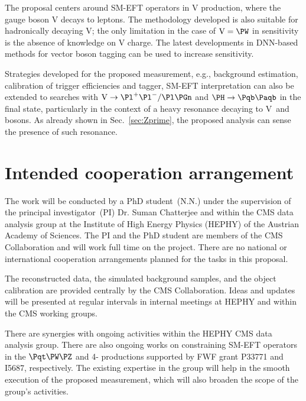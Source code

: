 \documentclass[a4paper,11pt]{article}
\newcommand{\Pb}{{{\Pqb}}\xspace}
\newcommand{\Pt}{{{\Pqt}}\xspace}
\newcommand{\PAb}{{{{\Paqb}}}\xspace}
\newcommand{\PAt}{{{{\Paqt}}}\xspace}
\renewcommand{\PV}{{{{V}}}\xspace}
\newcommand{\VH}{{{\PV}{\PH}}\xspace}
\begin{document}
The proposal centers around SM-EFT operators in \VH production, where the gauge boson \PV decays to leptons. 
The methodology developed is also suitable for hadronically decaying \PV; 
the only limitation in the case of $\textrm{\PV}={\PW}$ in sensitivity is the absence of knowledge on \PV charge. 
The latest developments in DNN-based methods for vector boson tagging can be used to increase sensitivity. 

Strategies developed for the proposed measurement, e.g., background estimation, calibration of trigger efficiencies and \PH tagger, SM-EFT interpretation can also be extended to searches with $\textrm{\PV}\rightarrow \Pl^{+}\Pl^{-} / \Pl \Pgn$ and $\PH \to \Pb \PAb$ in the final state, particularly in the context of a heavy resonance decaying to \PV~and~{\PH} bosons. 
As already shown in Sec.~\ref{sec:Zprime}, the proposed analysis can sense the presence of such resonance. 


\section{Intended cooperation arrangement} 

The work will be conducted by a PhD student~(N.N.) under the supervision of the principal investigator~(PI) Dr. Suman Chatterjee and within the  CMS data analysis group at the Institute of High Energy Physics (HEPHY) of the Austrian Academy of Sciences. The PI and the PhD student are members of the CMS Collaboration and will work full time on the project. 
There are no national or international cooperation arrangements planned for the tasks in this proposal.

The reconstructed data, the simulated background samples, and the object calibration are provided centrally by the CMS Collaboration. 
Ideas and updates will be presented at regular intervals in internal meetings at HEPHY and within the CMS working groups. 

There are synergies with ongoing activities within the HEPHY CMS data analysis group.
There are also ongoing works on constraining SM-EFT operators in the $\Pt\PW\PZ$ and 4-\Pt productions supported by FWF grant P33771 and I5687, respectively. 
The existing expertise in the group will help in the smooth execution of the proposed measurement, which will also broaden the scope of the group's activities.
\end{document}
